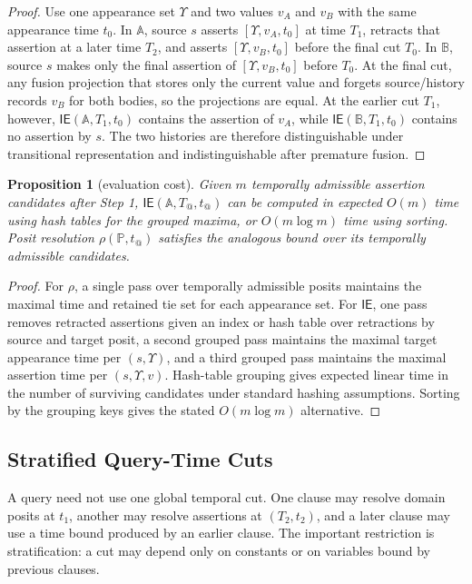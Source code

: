 \documentclass[a4paper,fleqn]{cas-sc}
\newcommand{\ie}{\mathsf{IE}}
\theoremstyle{plain}
\newtheorem{proposition}{Proposition}
\theoremstyle{remark}
\begin{document}
\begin{proof}
Use one appearance set \(\Upsilon\) and two values \(v_A\) and \(v_B\) with the same appearance time \(t_0\). In \(\mathbb{A}\), source \(s\) asserts \([\Upsilon,v_A,t_0]\) at time \(T_1\), retracts that assertion at a later time \(T_2\), and asserts \([\Upsilon,v_B,t_0]\) before the final cut \(T_0\). In \(\mathbb{B}\), source \(s\) makes only the final assertion of \([\Upsilon,v_B,t_0]\) before \(T_0\). At the final cut, any fusion projection that stores only the current value and forgets source/history records \(v_B\) for both bodies, so the projections are equal. At the earlier cut \(T_1\), however, \(\ie(\mathbb{A},T_1,t_0)\) contains the assertion of \(v_A\), while \(\ie(\mathbb{B},T_1,t_0)\) contains no assertion by \(s\). The two histories are therefore distinguishable under transitional representation and indistinguishable after premature fusion.
\end{proof}

\begin{proposition}[evaluation cost]
Given \(m\) temporally admissible assertion candidates after Step 1, \(\ie(\mathbb{A},T_@,t_@)\) can be computed in expected \(O(m)\) time using hash tables for the grouped maxima, or \(O(m\log m)\) time using sorting. Posit resolution \(\rho(\mathbb{P},t_@)\) satisfies the analogous bound over its temporally admissible candidates.
\end{proposition}

\begin{proof}
For \(\rho\), a single pass over temporally admissible posits maintains the maximal time and retained tie set for each appearance set. For \(\ie\), one pass removes retracted assertions given an index or hash table over retractions by source and target posit, a second grouped pass maintains the maximal target appearance time per \((s,\Upsilon)\), and a third grouped pass maintains the maximal assertion time per \((s,\Upsilon,v)\). Hash-table grouping gives expected linear time in the number of surviving candidates under standard hashing assumptions. Sorting by the grouping keys gives the stated \(O(m\log m)\) alternative.
\end{proof}

\subsection{Stratified Query-Time Cuts}
A query need not use one global temporal cut. One clause may resolve domain posits at \(t_1\), another may resolve assertions at \((T_2,t_2)\), and a later clause may use a time bound produced by an earlier clause. The important restriction is stratification: a cut may depend only on constants or on variables bound by previous clauses.
\end{document}
